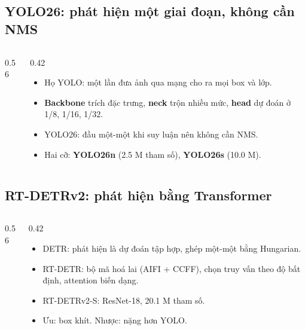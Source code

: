 \documentclass[aspectratio=\mlwAspectRatio, \mlwBaseSize, t]{beamer}
\begin{document}
\subsection{YOLO26: phát hiện một giai đoạn, không cần NMS}
\begin{frame}{\stitle}
  \begin{columns}[T]
    \begin{column}{0.56\textwidth}
      \centering
    \end{column}
    \begin{column}{0.42\textwidth}
      \begin{itemize}
        \item Họ YOLO: một lần đưa ảnh qua mạng cho ra mọi box và lớp.
        \item \textbf{Backbone} trích đặc trưng, \textbf{neck} trộn nhiều mức, \textbf{head} dự đoán ở 1/8, 1/16, 1/32.
        \item YOLO26: đầu một-một khi suy luận nên \alert{không cần NMS}.
        \item Hai cỡ: \textbf{YOLO26n} (2.5 M tham số), \textbf{YOLO26s} (10.0 M).
      \end{itemize}
    \end{column}
  \end{columns}
\end{frame}

\subsection{RT-DETRv2: phát hiện bằng Transformer}
\begin{frame}{\stitle}
  \begin{columns}[T]
    \begin{column}{0.56\textwidth}
      \centering
    \end{column}
    \begin{column}{0.42\textwidth}
      \begin{itemize}
        \item DETR: phát hiện là dự đoán tập hợp, ghép một-một bằng Hungarian.
        \item RT-DETR: bộ mã hoá lai (AIFI + CCFF), chọn truy vấn theo độ bất định, attention biến dạng.
        \item RT-DETRv2-S: ResNet-18, 20.1 M tham số.
        \item Ưu: box khít. Nhược: \alert{nặng hơn YOLO}.
      \end{itemize}
    \end{column}
  \end{columns}
\end{frame}
\end{document}
